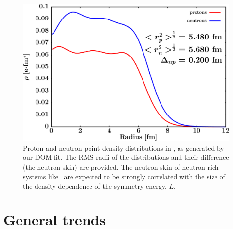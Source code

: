 \begin{figure}[tb]
    \centering
    \includegraphics[width=\textwidth]{figures/pb208_matterDensity.png}
    \caption[Proton and neutron matter density distributions in \pbEight]
    {
        Proton and neutron point density distributions in \pbEight, as
        generated by our DOM fit. The RMS radii of the distributions and their
        difference (the neutron skin) are provided. The neutron skin of
        neutron-rich systems like \pbEight\ are expected to be strongly correlated
        with the size of the density-dependence of the symmetry energy, $L$.
    }
    \label{Pb208MatterDistribution}
\end{figure}

\section{General trends}
